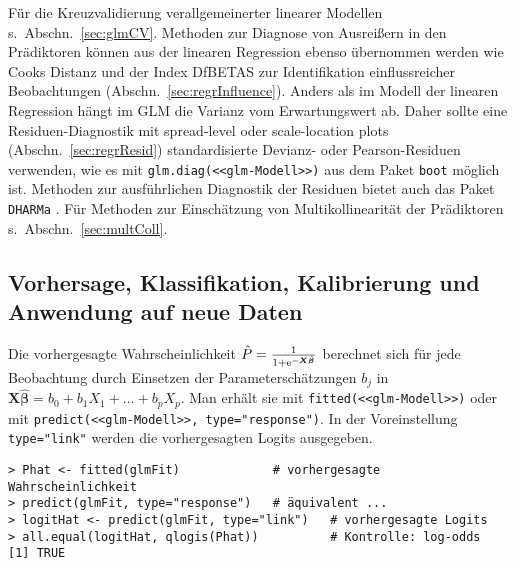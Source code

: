 Für die Kreuzvalidierung verallgemeinerter linearer Modellen s.\ Abschn.\ \ref{sec:glmCV}. Methoden zur Diagnose von Ausreißern in den Prädiktoren können aus der linearen Regression ebenso übernommen werden wie Cooks Distanz und der Index DfBETAS zur Identifikation einflussreicher Beobachtungen (Abschn.\ \ref{sec:regrInfluence}). Anders als im Modell der linearen Regression hängt im GLM die Varianz vom Erwartungswert ab. Daher sollte eine Residuen-Diagnostik mit spread-level oder scale-location plots (Abschn.\ \ref{sec:regrResid}) standardisierte Devianz- oder Pearson-Residuen verwenden, wie es mit \lstinline!glm.diag(<<glm-Modell>>)! aus dem Paket  \lstinline!boot!  möglich ist. Methoden zur ausführlichen Diagnostik der Residuen bietet auch das Paket  \lstinline!DHARMa! \cite{Hartig2022}. Für Methoden zur Einschätzung von Multikollinearität der Prädiktoren s.\ Abschn.\ \ref{sec:multColl}.

\subsection{Vorhersage, Klassifikation, Kalibrierung und Anwendung auf neue Daten}
\label{sec:logisticPred}

Die vorhergesagte Wahrscheinlichkeit $\hat{P} = \frac{1}{1+{\mathrm{e}}^{- \bm{X} \hat{\bm{\beta}}}}$ berechnet sich für jede Beobachtung durch Einsetzen der Parameterschätzungen $b_{j}$ in $\bm{X} \hat{\bm{\beta}} = b_{0} + b_{1} X_{1} + \dots + b_{p} X_{p}$. Man erhält sie mit \lstinline!fitted(<<glm-Modell>>)! oder mit \lstinline!predict(<<glm-Modell>>, type="response")!. In der Voreinstellung \lstinline!type="link"! werden die vorhergesagten Logits ausgegeben.
\begin{lstlisting}
> Phat <- fitted(glmFit)             # vorhergesagte Wahrscheinlichkeit
> predict(glmFit, type="response")   # äquivalent ...
> logitHat <- predict(glmFit, type="link")   # vorhergesagte Logits
> all.equal(logitHat, qlogis(Phat))          # Kontrolle: log-odds
[1] TRUE
\end{lstlisting}

